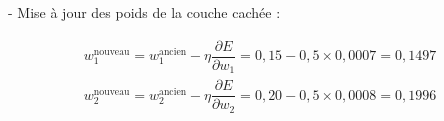 {\begin{enumerate}
{    	
    	- Mise à jour des poids de la couche cachée :
    	
    	
    	\begin{align*}
    	w_1^{\text{nouveau}} = w_1^{\text{ancien}} - \eta \dfrac{\partial E}{\partial w_1} = 0{,}15 - 0{,}5 \times 0{,}0007 = 0{,}1497 \\
    	w_2^{\text{nouveau}} = w_2^{\text{ancien}} - \eta \dfrac{\partial E}{\partial w_2} = 0{,}20 - 0{,}5 \times 0{,}0008 = 0{,}1996
    	\end{align*}
    	 }

\end{enumerate}

}

